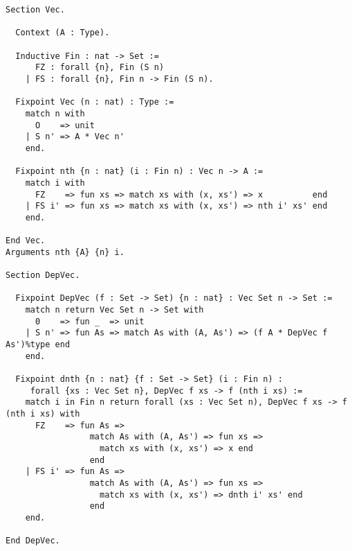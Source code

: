 \documentclass{article}
\begin{document}
\begin{lstlisting}[language=coq]
Section Vec.

  Context (A : Type).

  Inductive Fin : nat -> Set :=
      FZ : forall {n}, Fin (S n)
    | FS : forall {n}, Fin n -> Fin (S n).

  Fixpoint Vec (n : nat) : Type :=
    match n with
      O    => unit
    | S n' => A * Vec n'
    end.

  Fixpoint nth {n : nat} (i : Fin n) : Vec n -> A :=
    match i with
      FZ    => fun xs => match xs with (x, xs') => x          end
    | FS i' => fun xs => match xs with (x, xs') => nth i' xs' end
    end.

End Vec.
Arguments nth {A} {n} i.

Section DepVec.

  Fixpoint DepVec (f : Set -> Set) {n : nat} : Vec Set n -> Set :=
    match n return Vec Set n -> Set with
      0    => fun _  => unit
    | S n' => fun As => match As with (A, As') => (f A * DepVec f As')%type end
    end.

  Fixpoint dnth {n : nat} {f : Set -> Set} (i : Fin n) :
     forall {xs : Vec Set n}, DepVec f xs -> f (nth i xs) :=
    match i in Fin n return forall (xs : Vec Set n), DepVec f xs -> f (nth i xs) with
      FZ    => fun As =>
                 match As with (A, As') => fun xs =>
                   match xs with (x, xs') => x end
                 end
    | FS i' => fun As =>
                 match As with (A, As') => fun xs =>
                   match xs with (x, xs') => dnth i' xs' end
                 end
    end.

End DepVec.
\end{lstlisting}



\end{document}
